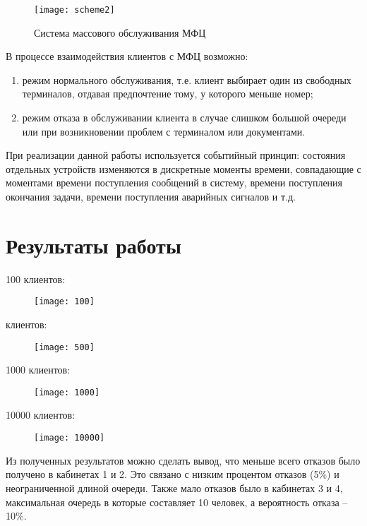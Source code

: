 \documentclass[a4paper,fontsize=12bp]{extreport}
\begin{document}
\begin{figure}[H]
    \texttt{[image: scheme2]}
    \caption{Система массового обслуживания МФЦ}
    \label{fig:2}
\end{figure}

В процессе взаимодействия клиентов с МФЦ возможно: 
\begin{enumerate}
\item режим нормального обслуживания, т.е. клиент выбирает один из свободных терминалов, отдавая предпочтение тому, у которого меньше номер;
\item режим отказа в обслуживании клиента в случае слишком большой очереди или при возникновении проблем с терминалом или документами.\\
\end{enumerate}

При реализации данной работы используется событийный принцип: состояния отдельных устройств изменяются в дискретные моменты времени, совпадающие с моментами времени поступления сообщений в систему, времени поступления окончания задачи, времени поступления аварийных сигналов и т.д.\\
 

\section*{Результаты работы}

100 клиентов: 

\begin{figure}[H]
    \texttt{[image: 100]}
\end{figure}

 клиентов: 

\begin{figure}[H]
    \texttt{[image: 500]}
\end{figure}


1000 клиентов: 

\begin{figure}[H]
    \texttt{[image: 1000]}
\end{figure}


10000 клиентов: 

\begin{figure}[H]
    \texttt{[image: 10000]}
\end{figure}

Из полученных результатов можно сделать вывод, что меньше всего отказов было получено в кабинетах 1 и 2. Это связано с низким процентом отказов (5\%) и неограниченной длиной очереди. Также мало отказов было в кабинетах 3 и 4, максимальная очередь в которые составляет 10 человек, а вероятность отказа -- 10\%.
\end{document}
